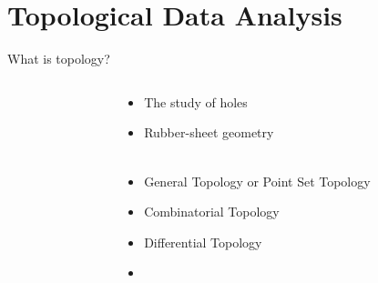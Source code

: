 
\section{Topological Data Analysis}
\frame{\sectionpage}

\begin{frame}{What is topology?}
\begin{columns}
\begin{column}{0.6\linewidth}
\end{column}
\begin{column}{0.4\linewidth}
\begin{itemize}[<+->]
	\item The study of holes
	\item Rubber-sheet geometry\\~\\
\end{itemize}
\begin{itemize}[<+->]
	\item General Topology or Point Set Topology
	\item Combinatorial Topology
	\item Differential Topology
	\item {}
\end{itemize}
\end{column}
\end{columns}
\end{frame}

